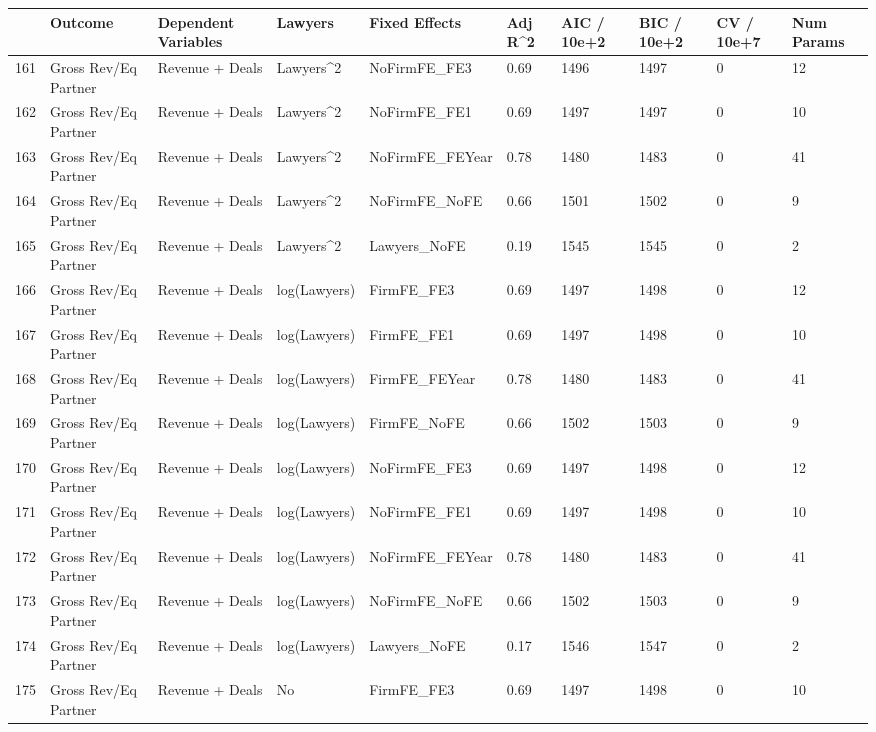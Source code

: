 \begin{table}[ht]
\centering
\begin{tabular}{rlllllllll}
  \hline
 & Outcome & Dependent Variables & Lawyers & Fixed Effects & Adj R^2 & AIC / 10e+2 & BIC / 10e+2 & CV / 10e+7 & Num Params \\ 
  \hline
161 & Gross Rev/Eq Partner & Revenue + Deals & Lawyers^2 & NoFirmFE\_FE3 & 0.69 & 1496 & 1497 & 0 & 12 \\ 
  162 & Gross Rev/Eq Partner & Revenue + Deals & Lawyers^2 & NoFirmFE\_FE1 & 0.69 & 1497 & 1497 & 0 & 10 \\ 
  163 & Gross Rev/Eq Partner & Revenue + Deals & Lawyers^2 & NoFirmFE\_FEYear & 0.78 & 1480 & 1483 & 0 & 41 \\ 
  164 & Gross Rev/Eq Partner & Revenue + Deals & Lawyers^2 & NoFirmFE\_NoFE & 0.66 & 1501 & 1502 & 0 & 9 \\ 
  165 & Gross Rev/Eq Partner & Revenue + Deals & Lawyers^2 & Lawyers\_NoFE & 0.19 & 1545 & 1545 & 0 & 2 \\ 
  166 & Gross Rev/Eq Partner & Revenue + Deals & log(Lawyers) & FirmFE\_FE3 & 0.69 & 1497 & 1498 & 0 & 12 \\ 
  167 & Gross Rev/Eq Partner & Revenue + Deals & log(Lawyers) & FirmFE\_FE1 & 0.69 & 1497 & 1498 & 0 & 10 \\ 
  168 & Gross Rev/Eq Partner & Revenue + Deals & log(Lawyers) & FirmFE\_FEYear & 0.78 & 1480 & 1483 & 0 & 41 \\ 
  169 & Gross Rev/Eq Partner & Revenue + Deals & log(Lawyers) & FirmFE\_NoFE & 0.66 & 1502 & 1503 & 0 & 9 \\ 
  170 & Gross Rev/Eq Partner & Revenue + Deals & log(Lawyers) & NoFirmFE\_FE3 & 0.69 & 1497 & 1498 & 0 & 12 \\ 
  171 & Gross Rev/Eq Partner & Revenue + Deals & log(Lawyers) & NoFirmFE\_FE1 & 0.69 & 1497 & 1498 & 0 & 10 \\ 
  172 & Gross Rev/Eq Partner & Revenue + Deals & log(Lawyers) & NoFirmFE\_FEYear & 0.78 & 1480 & 1483 & 0 & 41 \\ 
  173 & Gross Rev/Eq Partner & Revenue + Deals & log(Lawyers) & NoFirmFE\_NoFE & 0.66 & 1502 & 1503 & 0 & 9 \\ 
  174 & Gross Rev/Eq Partner & Revenue + Deals & log(Lawyers) & Lawyers\_NoFE & 0.17 & 1546 & 1547 & 0 & 2 \\ 
  175 & Gross Rev/Eq Partner & Revenue + Deals & No & FirmFE\_FE3 & 0.69 & 1497 & 1498 & 0 & 10 \\ 

\end{tabular}
\end{table}
